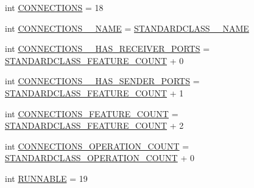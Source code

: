\begin{DoxyCompactItemize}
\item 
int \hyperlink{interfaceshootingmachineemfmodel_1_1_shootingmachineemfmodel_package_a8a76dc627f9336bbd84e2f73057f5f54}{C\-O\-N\-N\-E\-C\-T\-I\-O\-N\-S} = 18
\item 
int \hyperlink{interfaceshootingmachineemfmodel_1_1_shootingmachineemfmodel_package_ae65f6a808aa6f9db8f48fba1209cd485}{C\-O\-N\-N\-E\-C\-T\-I\-O\-N\-S\-\_\-\-\_\-\-N\-A\-M\-E} = \hyperlink{interfaceshootingmachineemfmodel_1_1_shootingmachineemfmodel_package_a06475d7d54d52ee19b2aaf4d5d73c738}{S\-T\-A\-N\-D\-A\-R\-D\-C\-L\-A\-S\-S\-\_\-\-\_\-\-N\-A\-M\-E}
\item 
int \hyperlink{interfaceshootingmachineemfmodel_1_1_shootingmachineemfmodel_package_a3760c55c51ab5f6ecc162f371ad4f14a}{C\-O\-N\-N\-E\-C\-T\-I\-O\-N\-S\-\_\-\-\_\-\-H\-A\-S\-\_\-\-R\-E\-C\-E\-I\-V\-E\-R\-\_\-\-P\-O\-R\-T\-S} = \hyperlink{interfaceshootingmachineemfmodel_1_1_shootingmachineemfmodel_package_a14037f66989b3107e402142df96ee9aa}{S\-T\-A\-N\-D\-A\-R\-D\-C\-L\-A\-S\-S\-\_\-\-F\-E\-A\-T\-U\-R\-E\-\_\-\-C\-O\-U\-N\-T} + 0
\item 
int \hyperlink{interfaceshootingmachineemfmodel_1_1_shootingmachineemfmodel_package_a5e6aac734628e977a0c8ef070feb784b}{C\-O\-N\-N\-E\-C\-T\-I\-O\-N\-S\-\_\-\-\_\-\-H\-A\-S\-\_\-\-S\-E\-N\-D\-E\-R\-\_\-\-P\-O\-R\-T\-S} = \hyperlink{interfaceshootingmachineemfmodel_1_1_shootingmachineemfmodel_package_a14037f66989b3107e402142df96ee9aa}{S\-T\-A\-N\-D\-A\-R\-D\-C\-L\-A\-S\-S\-\_\-\-F\-E\-A\-T\-U\-R\-E\-\_\-\-C\-O\-U\-N\-T} + 1
\item 
int \hyperlink{interfaceshootingmachineemfmodel_1_1_shootingmachineemfmodel_package_ac0d9cfff44a875c0371733b0c3f596bc}{C\-O\-N\-N\-E\-C\-T\-I\-O\-N\-S\-\_\-\-F\-E\-A\-T\-U\-R\-E\-\_\-\-C\-O\-U\-N\-T} = \hyperlink{interfaceshootingmachineemfmodel_1_1_shootingmachineemfmodel_package_a14037f66989b3107e402142df96ee9aa}{S\-T\-A\-N\-D\-A\-R\-D\-C\-L\-A\-S\-S\-\_\-\-F\-E\-A\-T\-U\-R\-E\-\_\-\-C\-O\-U\-N\-T} + 2
\item 
int \hyperlink{interfaceshootingmachineemfmodel_1_1_shootingmachineemfmodel_package_af57e94773235546a64e6cba28a474893}{C\-O\-N\-N\-E\-C\-T\-I\-O\-N\-S\-\_\-\-O\-P\-E\-R\-A\-T\-I\-O\-N\-\_\-\-C\-O\-U\-N\-T} = \hyperlink{interfaceshootingmachineemfmodel_1_1_shootingmachineemfmodel_package_a2fe5d848cfe0a02fe5609e2c5ed7e7c7}{S\-T\-A\-N\-D\-A\-R\-D\-C\-L\-A\-S\-S\-\_\-\-O\-P\-E\-R\-A\-T\-I\-O\-N\-\_\-\-C\-O\-U\-N\-T} + 0
\item 
int \hyperlink{interfaceshootingmachineemfmodel_1_1_shootingmachineemfmodel_package_a677df60e3408957ae1a09879e817b6e4}{R\-U\-N\-N\-A\-B\-L\-E} = 19

\end{DoxyCompactItemize}
